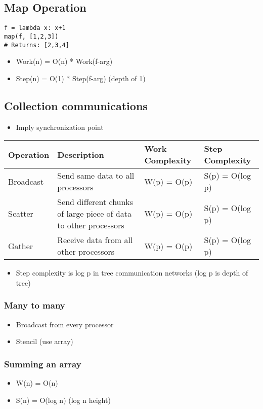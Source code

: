 \documentclass{assignments}
\begin{document}
\subsection*{Map Operation}
\label{sec:org8785a04}
\begin{verbatim}
f = lambda x: x+1
map(f, [1,2,3])
# Returns: [2,3,4]
\end{verbatim}
\begin{itemize}
\item Work(n) = O(n) * Work(f-arg)
\item Step(n) = O(1) * Step(f-arg) (depth of 1)
\end{itemize}
\subsection*{Collection communications}
\label{sec:orgeb4dc7b}
\begin{itemize}
\item Imply synchronization point
\end{itemize}
\begin{center}
\begin{tabular}{llll}
Operation & Description & Work Complexity & Step Complexity\\[0pt]
\hline
Broadcast & Send same data to all processors & W(p) = O(p) & S(p) = O(log p)\\[0pt]
Scatter & Send different chunks of large piece of data to other processors & W(p) = O(p) & S(p) = O(log p)\\[0pt]
Gather & Receive data from all other processors & W(p) = O(p) & S(p) = O(log p)\\[0pt]
\end{tabular}
\end{center}
\begin{itemize}
\item Step complexity is log p in tree communication networks (log p is depth of tree)
\end{itemize}
\subsubsection*{Many to many}
\label{sec:orgf699487}
\begin{itemize}
\item Broadcast from every processor
\item Stencil (use array)
\end{itemize}
\subsubsection*{Summing an array}
\label{sec:org7294189}
\begin{itemize}
\item W(n) = O(n)
\item S(n) = O(log n) (log n height)
\end{itemize}
\end{document}

